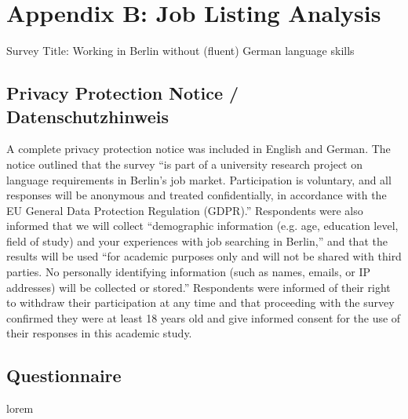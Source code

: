 \section{Appendix B: Job Listing Analysis}

\noindent Survey Title: Working in Berlin without (fluent) German language skills

\subsection{Privacy Protection Notice / Datenschutzhinweis}

A complete privacy protection notice was included in English and German. The notice outlined that the survey “is part of a university research project on language requirements in Berlin’s job market. Participation is voluntary, and all responses will be anonymous and treated confidentially, in accordance with the EU General Data Protection Regulation (GDPR).” Respondents were also informed that we will collect “demographic information (e.g. age, education level, field of study) and your experiences with job searching in Berlin,” and that the results will be used “for academic purposes only and will not be shared with third parties. No personally identifying information (such as names, emails, or IP addresses) will be collected or stored.” Respondents were informed of their right to withdraw their participation at any time and that proceeding with the survey confirmed they were at least 18 years old and give informed consent for the use of their responses in this academic study.

\subsection{Questionnaire}
lorem


\clearpage